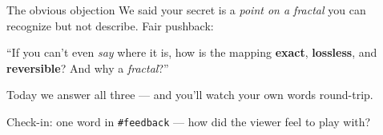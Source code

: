 \documentclass[aspectratio=169,11pt]{beamer}
\begin{document}

\begin{frame}{The obvious objection}
  We said your secret is a \emph{point on a fractal} you can recognize but not
  describe. Fair pushback:
  \begin{block}{}
    ``If you can't even \emph{say} where it is, how is the mapping \textbf{exact},
    \textbf{lossless}, and \textbf{reversible}? And why a \emph{fractal}?''
  \end{block}
  \vspace{4pt}
  Today we answer all three --- and you'll watch your own words round-trip.
  \begin{center}\footnotesize\color{graytext}
  Check-in: one word in \texttt{\#feedback} --- how did the viewer feel to play with?
  \end{center}
\end{frame}
\end{document}
